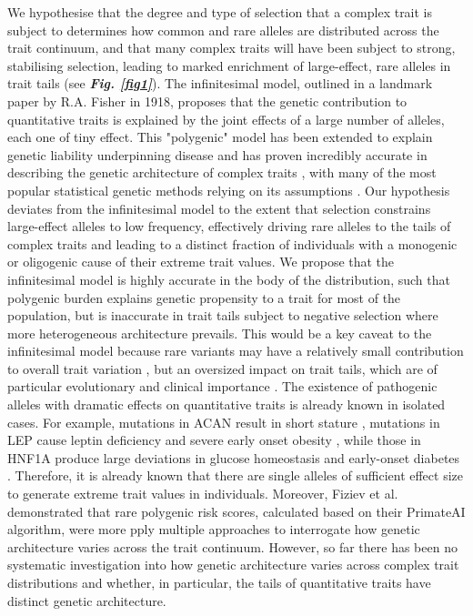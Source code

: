 \documentclass[12pt]{zHenriquesLab-StyleBioRxiv}
\newcommand\fref[1]{\normalsize{\textbf{\textit{Fig. \ref{#1}}}}\normalsize{}}
\begin{document}
We hypothesise that the degree and type of selection that a complex trait is subject to determines 
how common and rare alleles are distributed across the trait continuum, and that many complex 
traits will have been subject to strong, stabilising selection, leading to marked enrichment 
of large-effect, rare alleles in trait tails (see \fref{fig1}). The infinitesimal model, outlined in a 
landmark paper \cite{Fisher1919} by R.A. Fisher in 1918, proposes that the genetic contribution 
to quantitative traits is explained by the joint effects of a large number of alleles, 
each one of tiny effect. This "polygenic" model has been extended to explain genetic liability 
underpinning disease and has proven incredibly accurate in describing the genetic architecture 
of complex traits \cite{Barton2017}, with many of the most popular statistical genetic methods 
relying on its assumptions \cite{Yang2011, BulikSullivan2015, Choi2020}. 
Our hypothesis deviates 
from the infinitesimal model to the extent that selection constrains large-effect alleles to 
low frequency, effectively driving rare alleles to the tails of complex traits and leading to 
a distinct fraction of individuals with a monogenic or oligogenic cause of their extreme trait values. 
We propose that the infinitesimal model is highly accurate in the body of the distribution, 
such that polygenic burden explains genetic propensity to a trait for most of the population, 
but is inaccurate in trait tails subject to negative selection where more heterogeneous 
architecture prevails. This would be a key caveat to the infinitesimal model because rare 
variants may have a relatively small contribution to overall trait variation \cite{Pathan2024}, 
but an oversized impact on trait tails, which are of particular evolutionary and 
clinical importance \cite{Kingsolver2007, Ference2018, Kyrou2000}.
The existence of pathogenic alleles with dramatic effects on quantitative 
traits is already known in isolated cases. For example, mutations in ACAN 
result in short stature \cite{vanDerSteen2017}, mutations in LEP cause leptin 
deficiency and severe early onset obesity \cite{Saeed2015}, while those in HNF1A 
produce large deviations in glucose homeostasis and early-onset diabetes \cite{Miyachi2022}. 
Therefore, it is already known that there are single alleles of sufficient effect size 
to generate extreme trait values in individuals. Moreover, Fiziev et al. \cite{Fiziev2023} 
demonstrated that rare polygenic risk scores, calculated based on their PrimateAI algorithm, 
were more pply multiple approaches to interrogate how genetic architecture 
varies across the trait continuum. However, so far there has been no systematic investigation 
into how genetic architecture 
varies across complex trait distributions and whether, in particular, the tails of 
quantitative traits have distinct genetic architecture.
\end{document}
